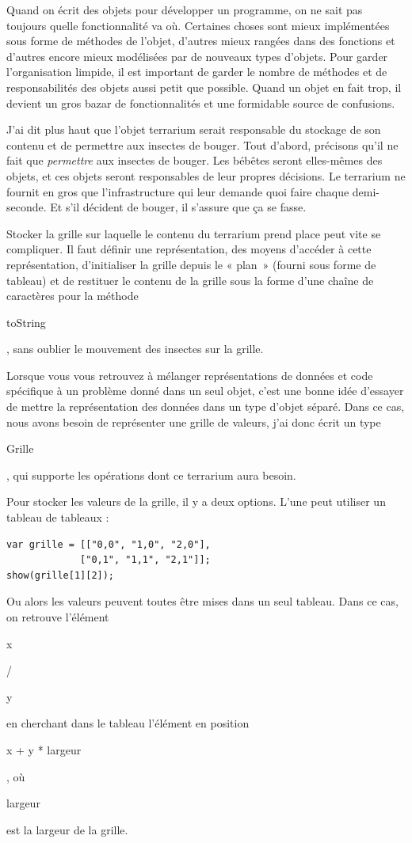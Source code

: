 \documentclass{FramateX}
\renewcommand{\texttt}[1]{\begin{sffamily}{#1}\end{sffamily}}
\begin{document}
\begin{center}\end{center}

Quand on écrit des objets pour développer un programme, on ne sait pas
toujours quelle fonctionnalité va où. Certaines choses sont mieux
implémentées sous forme de méthodes de l'objet, d'autres mieux rangées
dans des fonctions et d'autres encore mieux modélisées par de nouveaux
types d'objets. Pour garder l'organisation limpide, il est important de
garder le nombre de méthodes et de responsabilités des objets aussi
petit que possible. Quand un objet en fait trop, il devient un gros
bazar de fonctionnalités et une formidable source de confusions.

J'ai dit plus haut que l'objet terrarium serait responsable du stockage
de son contenu et de permettre aux insectes de bouger. Tout d'abord,
précisons qu'il ne fait que \emph{permettre} aux insectes de bouger. Les
bébêtes seront elles-mêmes des objets, et ces objets seront responsables
de leur propres décisions. Le terrarium ne fournit en gros que
l'infrastructure qui leur demande quoi faire chaque demi-seconde. Et
s'il décident de bouger, il s'assure que ça se fasse.

Stocker la grille sur laquelle le contenu du terrarium prend place peut
vite se compliquer. Il faut définir une représentation, des moyens
d'accéder à cette représentation, d'initialiser la grille depuis le «
plan~» (fourni sous forme de tableau) et de restituer le contenu de la
grille sous la forme d'une chaîne de caractères pour la méthode
\texttt{toString}, sans oublier le mouvement des insectes sur la grille.

\begin{center}\end{center}

Lorsque vous vous retrouvez à mélanger représentations de données et
code spécifique à un problème donné dans un seul objet, c'est une bonne
idée d'essayer de mettre la représentation des données dans un type
d'objet séparé. Dans ce cas, nous avons besoin de représenter une grille
de valeurs, j'ai donc écrit un type \texttt{Grille}, qui supporte les
opérations dont ce terrarium aura besoin.

Pour stocker les valeurs de la grille, il y a deux options. L'une peut
utiliser un tableau de tableaux :

\begin{lstlisting}
var grille = [["0,0", "1,0", "2,0"],
             ["0,1", "1,1", "2,1"]];
show(grille[1][2]);
\end{lstlisting}
Ou alors les valeurs peuvent toutes être mises dans un seul tableau.
Dans ce cas, on retrouve l'élément \texttt{x}/\texttt{y} en cherchant
dans le tableau l'élément en position \texttt{x + y * largeur}, où
\texttt{largeur} est la largeur de la grille.
\end{document}
